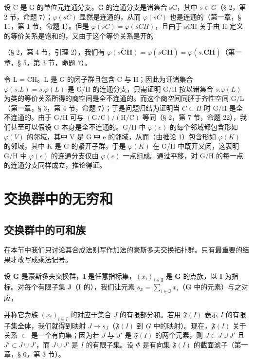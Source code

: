 设 C 是 G 的单位元连通分支。G 的连通分支是诸集合 sC，其中 \(s \in G\)（§ 2，第 2 节，命题 7）；\(\varphi(sC)\) 显然是连通的，从而 \(\overline{\varphi(sC)}\) 也是连通的（第一章，§ 11，第 1 节，命题 1）。但是 \(\varphi(sC) = \varphi(sCH)\)，且由于 sCH 关于由 H 定义的等价关系是饱和的，又由于这个等价关系是开的

（§ 2，第 4 节，引理 2），我们有 \(\overline{\varphi(s\mathbf{CH})} = \varphi(\overline{s\mathbf{CH}}) = \varphi(s.\overline{\mathbf{CH}})\)（第一章，§ 5，第 3 节，命题 7）。

令 L = CH。L 是 G 的闭子群且包含 C 与 H；因此为证诸集合 \(\varphi(s.L) = s.\varphi(L)\) 是 G/H 的连通分支，只需证明 G/H 按以诸集合 \(s.\varphi(L)\) 为类的等价关系所得的商空间是全不连通的。而这个商空间同胚于齐性空间 G/L（第一章，§ 3，第 4 节，命题 7）；于是问题归结为证明当 \(C \subset H\) 时 G/H 是全不连通的。由于 G/H 可与 \((\mathrm{G/C})/(\mathrm{H/C})\) 等同（§ 2，第 7 节，命题 22），我们甚至可以假设 G 本身是全不连通的。G/H 中 \(\varphi(e)\) 的每个邻域都包含形如 \(\varphi(V)\) 的邻域，其中 V 是 G 中 e 的邻域，从而（由推论 1）包含形如 \(\varphi(K)\) 的邻域，其中 K 是 G 的紧开子群。于是 \(\varphi(K)\) 在 G/H 中既开又闭，这表明 G/H 中 \(\varphi(e)\) 的连通分支仅由 \(\varphi(e)\) 一点组成。通过平移，对 G/H 的每一点的连通分支同样成立，推论得证。

\section{交换群中的无穷和}

\subsection{交换群中的可和族}

在本节中我们只讨论其合成法则写作加法的豪斯多夫交换拓扑群。只有最重要的结果才改写成乘法记号。

设 \(\mathbf{G}\) 是豪斯多夫交换群，\(\mathbf{I}\) 是任意指标集，\((x_{i})_{i\in \mathbf{I}}\) 是 \(\mathbf{G}\) 的点族，以 \(\mathbf{I}\) 为指标。对每个有限子集 \(\mathbf{J}\)（\(\mathbf{I}\) 的），我们让元素 \(s_{\mathbf{J}} = \sum_{i\in \mathbf{J}}x_i\)（\(\mathbf{G}\) 中的元素）与之对应，

并称它为族 \((x_{i})_{i\in I}\) 的对应于集合 \(J\) 的有限部分和。若用 \(\mathfrak{F}(I)\) 表示 \(I\) 的有限子集全体，我们就得到映射 \(J\to s_J\)（\(\mathfrak{F}(I)\) 到 \(G\) 中的映射）。现在，\(\mathfrak{F}(I)\) 关于关系 \(\subset\) 是一个有向集；因为若 \(J\) 与 \(J'\) 是 \(\mathfrak{F}(I)\) 的两个元素，则 \(J\subset J\cup J'\) 且 \(J'\subset J\cup J'\)，而 \(J\cup J'\) 是 \(I\) 的有限子集。设 \(\Phi\) 是有向集 \(\mathfrak{F}(I)\) 的截面滤子（第一章，§ 6，第 3 节）。

